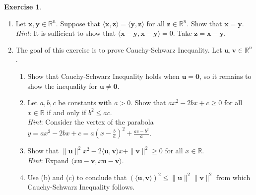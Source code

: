 \documentclass[12pt,letterpaper]{book}
\numberwithin{equation}{section}
\theoremstyle{definition}
\newtheorem{exercise}{\textbf{Exercise}}[chapter]
\newcommand{\vu}{\bm{u}}
\newcommand{\vv}{\bm{v}}
\newcommand{\vx}{\bm{x}}
\newcommand{\vy}{\bm{y}}
\newcommand{\vz}{\bm{z}}
\newcommand{\veczero}{\bm{0}}
\begin{document}
\begin{exercise}\label{basics of matrix exer} \quad
\begin{enumerate}[\bfseries 1.]
\item Let $\vx,\vy \in \mathbb{R}^n$. Suppose that $\langle \vx, \vz\rangle=\langle \vy, \vz\rangle$ for all $\vz\in \mathbb{R}^n$. Show that $\vx=\vy$.\\\textit{Hint}: It is sufficient to show that $\langle \vx-\vy, \vx-\vy\rangle=0$. Take $\vz=\vx-\vy$.

\item The goal of this exercise is to prove Cauchy-Schwarz Inequality. Let $\vu,\vv\in \mathbb{R}^n$.
\begin{enumerate}
\item Show that Cauchy-Schwarz Inequality holds when $\vu=\veczero$, so it remains to show the inequality for $\vu\neq \veczero$.
\item \label{CS part b} Let $a,b,c$ be constants with $a>0$. Show that $ax^2-2bx+c\geq 0$ for all $x\in \mathbb{R}$ if and only if $b^2\leq ac$.\\\textit{Hint}: Consider the vertex of the parabola $y=ax^2-2bx+c=a(x-\frac{b}{a})^2+\frac{ac-b^2}{a}$.
\item Show that $\|\vu\|^2 x^2-2\langle \vu,\vv\rangle x+\|\vv\|^2\geq 0$ for all $x\in \mathbb{R}$. \\\textit{Hint}: Expand $\langle x\vu-\vv,x\vu-\vv\rangle$.
\item Use (b) and (c) to conclude that $(\langle \vu,\vv \rangle)^2\leq \|\vu\|^2\|\vv\|^2$ from which Cauchy-Schwarz Inequality follows.
\end{enumerate}


\end{enumerate}
\end{exercise}
\end{document}

